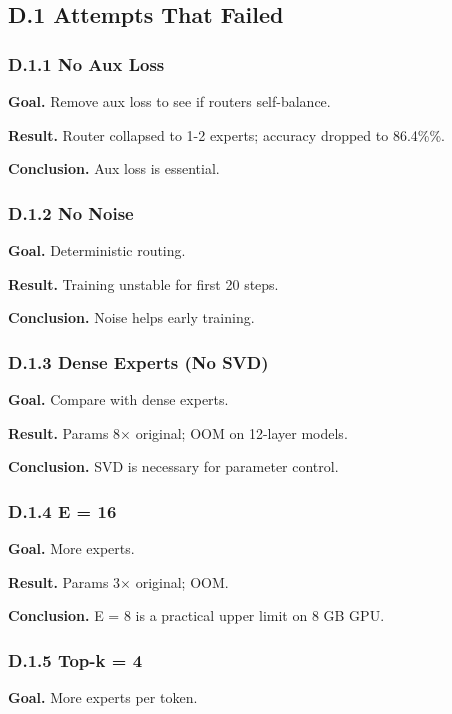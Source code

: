 \subsection{D.1 Attempts That Failed}

\subsubsection{D.1.1 No Aux Loss}

\textbf{Goal.} Remove aux loss to see if routers self-balance.

\textbf{Result.} Router collapsed to 1-2 experts; accuracy dropped to 86.4\%\%.

\textbf{Conclusion.} Aux loss is essential.

\subsubsection{D.1.2 No Noise}

\textbf{Goal.} Deterministic routing.

\textbf{Result.} Training unstable for first 20 steps.

\textbf{Conclusion.} Noise helps early training.

\subsubsection{D.1.3 Dense Experts (No SVD)}

\textbf{Goal.} Compare with dense experts.

\textbf{Result.} Params 8$\times$ original; OOM on 12-layer models.

\textbf{Conclusion.} SVD is necessary for parameter control.

\subsubsection{D.1.4 E = 16}

\textbf{Goal.} More experts.

\textbf{Result.} Params 3$\times$ original; OOM.

\textbf{Conclusion.} E = 8 is a practical upper limit on 8 GB GPU.

\subsubsection{D.1.5 Top-k = 4}

\textbf{Goal.} More experts per token.

